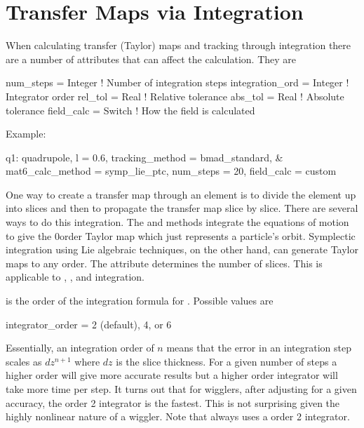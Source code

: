 \section{Transfer Maps via Integration}
\label{s:integ}

When calculating transfer (Taylor) maps and tracking through integration
there are a number of attributes that can affect the calculation. They are
\begin{example}
  num_steps = Integer         ! Number of integration steps
  integration_ord = Integer   ! Integrator order
  rel_tol = Real              ! Relative tolerance
  abs_tol = Real              ! Absolute tolerance
  field_calc = Switch         ! How the field is calculated
\end{example}
Example:
\begin{example}
  q1: quadrupole, l = 0.6, tracking_method = bmad_standard, &
        mat6_calc_method = symp_lie_ptc, num_steps = 20, field_calc = custom
\end{example}

One way to create a transfer map through an element is to divide the
element up into slices and then to propagate the transfer map slice by
slice.  There are several ways to do this integration. The
 and  methods integrate the equations of
motion to give the 0\Th order Taylor map which just represents a
particle's orbit.  Symplectic
integration using Lie algebraic
techniques, on the other hand, can generate Taylor maps to any order.
The  attribute determines the number of slices. This
is applicable to , , and
 integration.

 is the order of the integration formula for 
. Possible values are
\begin{example}
  integrator_order = 2 (default), 4, or 6
\end{example}
Essentially, an integration order of $n$ means that the error in an 
integration step scales as $dz^{n+1}$ where $dz$ is the slice thickness.
For a given number of steps a higher order will give more accurate results
but a higher order integrator will take more time per step. It turns out
that for wigglers, after adjusting  for a given accuracy, 
the order 2 integrator is the fastest. This is not surprising given the
highly nonlinear nature of a wiggler. Note that  always
uses a order 2 integrator.

